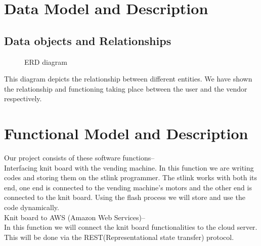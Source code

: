 \documentclass[oneside,a4paper,12pt]{report}
\begin{document}
\section{Data Model and Description}  
\subsection{Data objects and Relationships}
  \begin{center}
	\begin{figure}[!htbp]
		\centering
	  \caption{ERD diagram}
	  \label{fig:usecase}
	\end{figure}
\end{center}  
\newpage
This diagram depicts the relationship between different entities. We have shown the relationship and functioning taking place between the user and the vendor respectively.\\


\section{Functional Model and Description}  
Our project consists of these software functions--\\
Interfacing knit board with the vending machine.
In this function we are writing codes and storing them on the stlink programmer.
The stlink works with both its end, one end is connected to the vending machine's motors and the other end is connected to the knit board.
Using the flash process we will store and use the code dynamically.\\

Knit board to AWS (Amazon Web Services)--\\
In this function we will connect the knit board functionalities to the cloud server.
This will be done via the REST(Representational state transfer) protocol.\\
\end{document}

